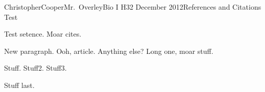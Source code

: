 \documentclass[12pt,letterpaper]{article}
\begin{document}
\begin{mla}{Christopher}{Cooper}{Mr.~Overley}{Bio I H}{32 December 2012}{References and Citations Test}

Test setence. \citep{aard11}
Moar cites. \citep{haluzan08,watkins12}

New paragraph. \citep{uigi12}
Ooh, article. \citep{milius12} Anything else? \citep{isueo12,hatter12}
Long one, moar stuff. \citep{putnam90}

Stuff. \citep{gw12}
Stuff2. \citep{tofa12}
Stuff3. \citep{welter12}

Stuff last. \citep{nrcs12}

\begingroup
\renewcommand{\section}[2]{}
\begin{workscited}




\end{workscited}
\endgroup

\end{mla}
\end{document}
